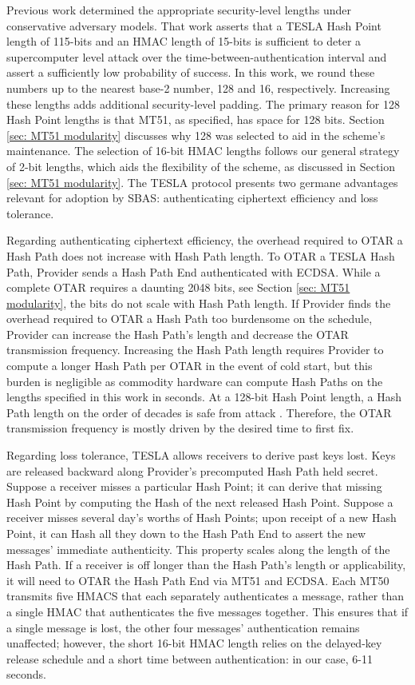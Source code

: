 \documentclass[letterpaper,times]{IONconf/IONconf}
\begin{document}
Previous work determined the appropriate security-level lengths under conservative adversary models\cite{Neish_Dissertation}.
That work asserts that a TESLA Hash Point length of 115-bits and an HMAC length of 15-bits is sufficient to deter a supercomputer level attack over the time-between-authentication interval and assert a sufficiently low probability of success.
In this work, we round these numbers up to the nearest base-2 number, 128 and 16, respectively.
Increasing these lengths adds additional security-level padding.
The primary reason for 128 Hash Point lengths is that MT51, as specified, has space for 128 bits.
Section \ref{sec: MT51 modularity} discusses why 128 was selected to aid in the scheme's maintenance.
The selection of 16-bit HMAC lengths follows our general strategy of 2-bit lengths, which aids the flexibility of the scheme, as discussed in Section \ref{sec: MT51 modularity}.
The TESLA protocol presents two germane advantages relevant for adoption by SBAS: authenticating ciphertext efficiency and loss tolerance.

Regarding authenticating ciphertext efficiency, the overhead required to OTAR a Hash Path does not increase with Hash Path length.
To OTAR a TESLA Hash Path, Provider sends a Hash Path End authenticated with ECDSA.
While a complete OTAR requires a daunting 2048 bits, see Section \ref{sec: MT51 modularity}, the bits do not scale with Hash Path length.
If Provider finds the overhead required to OTAR a Hash Path too burdensome on the schedule, Provider can increase the Hash Path's length and decrease the OTAR transmission frequency.
Increasing the Hash Path length requires Provider to compute a longer Hash Path per OTAR in the event of cold start, but this burden is negligible as commodity hardware can compute Hash Paths on the lengths specified in this work in seconds.
At a 128-bit Hash Point length, a Hash Path length on the order of decades is safe from attack \cite{Neish_Dissertation}.
Therefore, the OTAR transmission frequency is mostly driven by the desired time to first fix.

Regarding loss tolerance, TESLA allows receivers to derive past keys lost.
Keys are released backward along Provider's precomputed Hash Path held secret.
Suppose a receiver misses a particular Hash Point; it can derive that missing Hash Point by computing the Hash of the next released Hash Point.
Suppose a receiver misses several day's worths of Hash Points; upon receipt of a new Hash Point, it can Hash all they down to the Hash Path End to assert the new messages' immediate authenticity.
This property scales along the length of the Hash Path.
If a receiver is off longer than the Hash Path's length or applicability, it will need to OTAR the Hash Path End via MT51 and ECDSA.
Each MT50 transmits five HMACS that each separately authenticates a message, rather than a single HMAC that authenticates the five messages together.
This ensures that if a single message is lost, the other four messages' authentication remains unaffected; however, the short 16-bit HMAC length relies on the delayed-key release schedule and a short time between authentication: in our case, 6-11 seconds.
\end{document}
